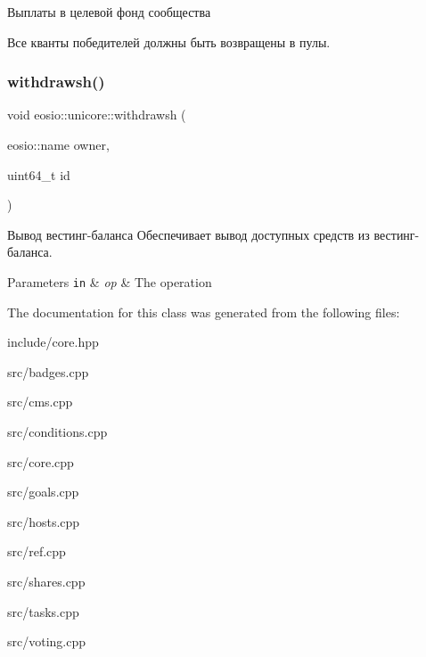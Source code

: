 Выплаты в целевой фонд сообщества

Все кванты победителей должны быть возвращены в пулы.\mbox{\label{classeosio_1_1unicore_a46b78c56992d90f8e41f05c62f7900cd}} 
\subsubsection{\texorpdfstring{withdrawsh()}{withdrawsh()}}
{\footnotesize\ttfamily void eosio\+::unicore\+::withdrawsh (\begin{DoxyParamCaption}\item[{eosio\+::name}]{owner,  }\item[{uint64\+\_\+t}]{id }\end{DoxyParamCaption})}



Вывод вестинг-\/баланса Обеспечивает вывод доступных средств из вестинг-\/баланса. 


\begin{DoxyParams}[1]{Parameters}
\mbox{\tt in}  & {\em op} & The operation \\
\hline
\end{DoxyParams}


The documentation for this class was generated from the following files\+:\begin{DoxyCompactItemize}
\item 
include/core.\+hpp\item 
src/badges.\+cpp\item 
src/cms.\+cpp\item 
src/conditions.\+cpp\item 
src/core.\+cpp\item 
src/goals.\+cpp\item 
src/hosts.\+cpp\item 
src/ref.\+cpp\item 
src/shares.\+cpp\item 
src/tasks.\+cpp\item 
src/voting.\+cpp\end{DoxyCompactItemize}
